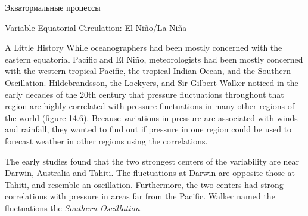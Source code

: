 \begin{chapter}{Экваториальные процессы}
\begin{section}{Variable Equatorial Circulation: El Ni\~{n}o/La Ni\~{n}a}
\begin{paragraph}{A Little History}
While oceanographers had been mostly concerned with the eastern
equatorial Pacific and El Ni\~{n}o, meteorologists had been mostly
concerned with the western tropical Pacific, the tropical Indian
Ocean, and the Southern Oscillation. Hildebrandsson, the Lockyers, and Sir Gilbert Walker
noticed in the early decades of the 20th century that pressure
fluctuations throughout that region are highly correlated with
pressure fluctuations in many other regions of the world (figure
14.6). Because variations in pressure are associated with winds and
rainfall, they wanted to find out if pressure in one region could be
used to forecast weather in other regions using the correlations.
%

The early studies found that the two strongest centers of the
variability are near Darwin, Australia and Tahiti. The fluctuations at
Darwin are opposite those at Tahiti, and resemble an
oscillation. Furthermore, the two centers had strong correlations with
pressure in areas far from the Pacific. Walker named the fluctuations
the \textit{Southern Oscillation}.
%


\end{paragraph}
\end{section}
\end{chapter}
